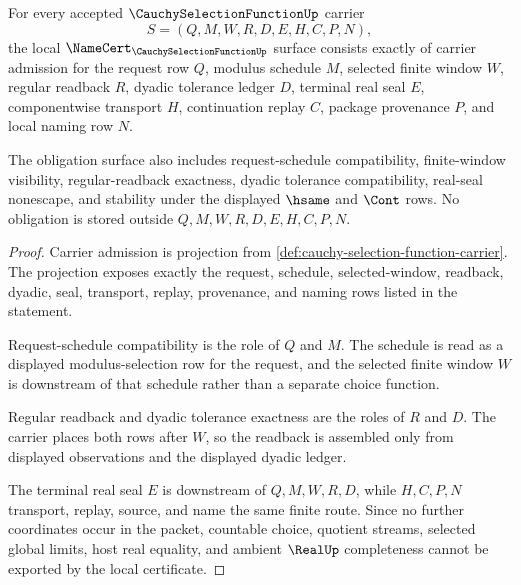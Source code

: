 \begin{theorem}
\label{thm:cauchy-selection-function-namecert-obligations}
For every accepted $\CauchySelectionFunctionUp$ carrier
$$
S=(Q,M,W,R,D,E,H,C,P,N),
$$
the local $\NameCert_{\CauchySelectionFunctionUp}$ surface consists exactly of carrier admission for the request row $Q$, modulus schedule $M$, selected finite window $W$, regular readback $R$, dyadic tolerance ledger $D$, terminal real seal $E$, componentwise transport $H$, continuation replay $C$, package provenance $P$, and local naming row $N$.

The obligation surface also includes request-schedule compatibility, finite-window visibility, regular-readback exactness, dyadic tolerance compatibility, real-seal nonescape, and stability under the displayed $\hsame$ and $\Cont$ rows. No obligation is stored outside $Q,M,W,R,D,E,H,C,P,N$.
\end{theorem}
\begin{proof}
Carrier admission is projection from \autoref{def:cauchy-selection-function-carrier}. The projection exposes exactly the request, schedule, selected-window, readback, dyadic, seal, transport, replay, provenance, and naming rows listed in the statement.

Request-schedule compatibility is the role of $Q$ and $M$. The schedule is read as a displayed modulus-selection row for the request, and the selected finite window $W$ is downstream of that schedule rather than a separate choice function.

Regular readback and dyadic tolerance exactness are the roles of $R$ and $D$. The carrier places both rows after $W$, so the readback is assembled only from displayed observations and the displayed dyadic ledger.

The terminal real seal $E$ is downstream of $Q,M,W,R,D$, while $H,C,P,N$ transport, replay, source, and name the same finite route. Since no further coordinates occur in the packet, countable choice, quotient streams, selected global limits, host real equality, and ambient $\RealUp$ completeness cannot be exported by the local certificate.
\end{proof}

